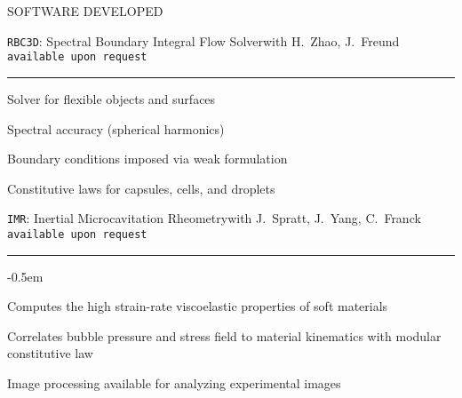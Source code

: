 \documentclass{resume} %
\newcommand{\sepss}{-0.5em}
\begin{document}
\begin{rSection}{{\Large S}OFTWARE DEVELOPED}
\begin{rSubsections}{\texttt{RBC3D}: Spectral Boundary Integral Flow Solver}{}{with H.\ Zhao, J.\ Freund}{}
\hfill{\texttt{available upon request}}
\vspace{-0.65cm}
\par\noindent\rule{0.97\textwidth}{0.4pt}

    \begin{minipage}{0.45\linewidth}
	\begin{list}{\textbullet}{\leftmargin=2.5em} 
        \item Solver for flexible objects and surfaces
        \item Spectral accuracy (spherical harmonics)
  	\end{list}
    \end{minipage}
    \hspace{-0.5cm}
    \begin{minipage}{0.65\linewidth}
	\begin{list}{\textbullet}{\leftmargin=2.5em} 
        \item Boundary conditions imposed via weak formulation
        \item Constitutive laws for capsules, cells, and droplets
  	\end{list}
    \end{minipage}
\end{rSubsections}
\medskip

\begin{rSubsections}{\texttt{IMR}: Inertial Microcavitation Rheometry}{}{with J.\ Spratt, J.\ Yang, C.\ Franck}{}
\hfill{\texttt{available upon request}}
\vspace{-0.65cm}
\par\noindent\rule{0.97\textwidth}{0.4pt}
	\begin{list}{\textbullet}{\leftmargin=2.5em} 
	    \itemsep \sepss 
        \vspace{-0.2cm}
        \item Computes the high strain-rate viscoelastic properties of soft materials
        \item Correlates bubble pressure and stress field to material kinematics with modular constitutive law
        \item Image processing available for analyzing experimental images
  	\end{list}
\end{rSubsections}

\end{rSection}
\end{document}

